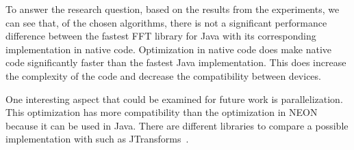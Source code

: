 To answer the research question, based on the results from the experiments, we can see that, of the chosen algorithms, there is not a significant performance difference between the fastest FFT library for Java with its corresponding implementation in native code. Optimization in native code does make native code significantly faster than the fastest Java implementation. This does increase the complexity of the code and decrease the compatibility between devices.

One interesting aspect that could be examined for future work is parallelization. This optimization has more compatibility than the optimization in NEON because it can be used in Java. There are different libraries to compare a possible implementation with such as JTransforms~\cite{jtransforms:benchmark}.
